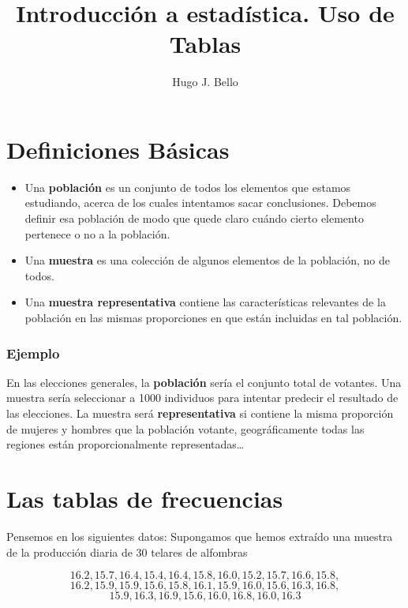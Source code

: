 \documentclass[
]{article}
\title{Introducción a estadística. Uso de Tablas}
\author{Hugo J. Bello}
\date{}
\begin{document}
\maketitle

\hypertarget{definiciones-buxe1sicas}{%
\section{Definiciones Básicas}\label{definiciones-buxe1sicas}}

\begin{itemize}
\item
  Una \textbf{población} es un conjunto de todos los elementos que
  estamos estudiando, acerca de los cuales intentamos sacar
  conclusiones. Debemos definir esa población de modo que quede claro
  cuándo cierto elemento pertenece o no a la población.
\item
  Una \textbf{muestra} es una colección de algunos elementos de la
  población, no de todos.
\item
  Una \textbf{muestra representativa} contiene las características
  relevantes de la población en las mismas proporciones en que están
  incluidas en tal población.
\end{itemize}

\hypertarget{ejemplo}{%
\subsubsection{Ejemplo}\label{ejemplo}}

En las elecciones generales, la \textbf{población} sería el conjunto
total de votantes. Una muestra sería seleccionar a 1000 individuos para
intentar predecir el resultado de las elecciones. La muestra será
\textbf{representativa} si contiene la misma proporción de mujeres y
hombres que la población votante, geográficamente todas las regiones
están proporcionalmente representadas\ldots{}

\hypertarget{las-tablas-de-frecuencias}{%
\section{Las tablas de frecuencias}\label{las-tablas-de-frecuencias}}

Pensemos en los siguientes datos: Supongamos que hemos extraído una
muestra de la producción diaria de 30 telares de alfombras

\[16.2, 15.7, 16.4, 15.4, 16.4, 15.8, 16.0, 15.2, 15.7, 16.6, 15.8,\]
\[ 16.2, 15.9, 15.9, 15.6, 15.8, 16.1, 15.9, 16.0, 15.6, 16.3, 16.8,\]
\[ 15.9, 16.3, 16.9, 15.6, 16.0, 16.8, 16.0, 16.3\]
\end{document}
